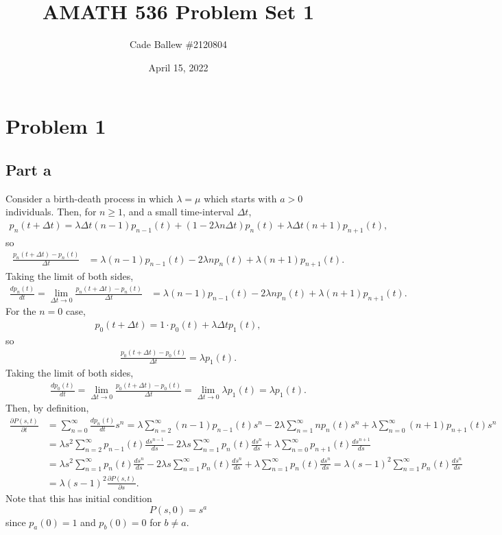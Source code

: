 \documentclass{article}
\title{AMATH 536 Problem Set 1}
\author{Cade Ballew \#2120804}
\date{April 15, 2022}
\begin{document}
	
\maketitle
	
\section{Problem 1}
\subsection{Part a}
Consider a birth-death process in which $\lambda=\mu$ which starts with $a>0$ individuals. Then, for $n\geq1$, and a small time-interval $\Delta t$,
\begin{align*}
p_n(t+\Delta t)=\lambda\Delta t(n-1)p_{n-1}(t)+(1-2\lambda n\Delta t)p_n(t)+\lambda\Delta t(n+1)p_{n+1}(t),
\end{align*}
so 
\begin{align*}
\frac{p_n(t+\Delta t)-p_n(t)}{\Delta t}&=\lambda(n-1)p_{n-1}(t)-2\lambda n p_n(t)+\lambda(n+1)p_{n+1}(t).
\end{align*}
Taking the limit of both sides,
\begin{align*}
\frac{d p_n(t)}{dt}=\lim_{\Delta t\to0}\frac{p_n(t+\Delta t)-p_n(t)}{\Delta t}&=\lambda(n-1)p_{n-1}(t)-2\lambda n p_n(t)+\lambda(n+1)p_{n+1}(t).
\end{align*}
For the $n=0$ case, 
\begin{align*}
	p_0(t+\Delta t)=1\cdot p_0(t)+\lambda\Delta t p_{1}(t),
\end{align*}
so 
\begin{align*}
	\frac{p_0(t+\Delta t)-p_0(t)}{\Delta t}=\lambda p_{1}(t).
\end{align*}
Taking the limit of both sides,
\begin{align*}
	\frac{d p_0(t)}{dt}=\lim_{\Delta t\to0}\frac{p_0(t+\Delta t)-p_0(t)}{\Delta t}=\lim_{\Delta t\to0}\lambda p_{1}(t)=\lambda p_{1}(t).
\end{align*}
Then, by definition,
\begin{align*}
\frac{\partial P(s,t)}{\partial t}&=\sum_{n=0}^\infty\frac{d p_n(t)}{d t}s^n=\lambda\sum_{n=2}^\infty(n-1)p_{n-1}(t)s^n-2\lambda\sum_{n=1}^\infty n p_n(t)s^n+\lambda\sum_{n=0}^\infty(n+1)p_{n+1}(t)s^n\\&=
\lambda s^2\sum_{n=2}^\infty p_{n-1}(t)\frac{d s^{n-1}}{ds}-2\lambda s\sum_{n=1}^\infty p_{n}(t)\frac{d s^{n}}{ds}+\lambda\sum_{n=0}^\infty p_{n+1}(t)\frac{d s^{n+1}}{ds}\\&=
\lambda s^2\sum_{n=1}^\infty p_{n}(t)\frac{d s^{n}}{ds}-2\lambda s\sum_{n=1}^\infty p_{n}(t)\frac{d s^{n}}{ds}+\lambda\sum_{n=1}^\infty p_{n}(t)\frac{d s^{n}}{ds}=\lambda(s-1)^2\sum_{n=1}^\infty p_{n}(t)\frac{d s^{n}}{ds}\\&=
\lambda(s-1)^2\frac{\partial P(s,t)}{\partial s}.
\end{align*}
Note that this has initial condition
\[
P(s,0)=s^a
\]
since $p_a(0)=1$ and $p_b(0)=0$ for $b\neq a$.
\end{document}
